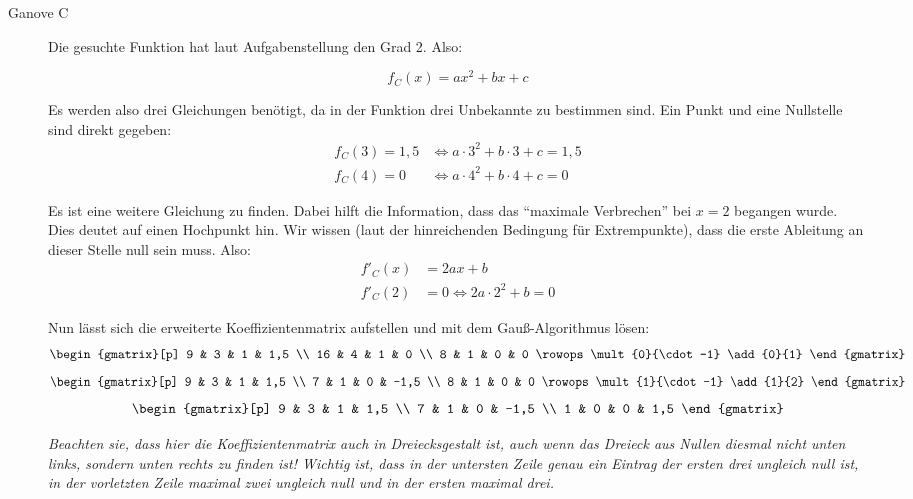 \documentclass[11pt, a4paper,
]{scrartcl}
\begin{document}
\begin{aufgabe}
\begin{loesung}
\begin{description}
				\item[Ganove C]
				Die gesuchte Funktion hat laut Aufgabenstellung den Grad 2. Also:

				\[ f_C(x) = ax^2 + bx + c \]

				Es werden also drei Gleichungen benötigt, da in der Funktion drei Unbekannte zu bestimmen sind. Ein Punkt und eine Nullstelle sind direkt gegeben:
				\begin{align*}
					f_C(3) = 1,5 &\Leftrightarrow a\cdot 3^2 + b\cdot 3 + c = 1,5 \\
					f_C(4) = 0 &\Leftrightarrow a\cdot 4^2 + b\cdot 4 + c = 0
				\end{align*}

				Es ist eine weitere Gleichung zu finden. Dabei hilft die Information, dass das \enquote{maximale Verbrechen} bei $x=2$ begangen wurde. Dies deutet auf einen Hochpunkt hin. Wir wissen (laut der hinreichenden Bedingung für Extrempunkte), dass die erste Ableitung an dieser Stelle null sein muss. Also:
				\begin{align*}
					f'_C(x) &= 2ax + b \\
					f'_C(2) &= 0 \Leftrightarrow 2a\cdot 2^2 + b = 0
				\end{align*}

				Nun lässt sich die erweiterte Koeffizientenmatrix aufstellen und mit dem Gauß-Algorithmus lösen:
				\[ \begin{gmatrix}[p]
				9 & 3 & 1 & 1,5 \\
				16 & 4 & 1 & 0 \\
				8 & 1 & 0 & 0
				\rowops
				\mult{0}{\cdot -1}
				\add{0}{1}
				\end{gmatrix} \]
				\[ \begin{gmatrix}[p]
				9 & 3 & 1 & 1,5 \\
				7 & 1 & 0 & -1,5 \\
				8 & 1 & 0 & 0
				\rowops
				\mult{1}{\cdot -1}
				\add{1}{2}
				\end{gmatrix} \]
				\[ \begin{gmatrix}[p]
				9 & 3 & 1 & 1,5 \\
				7 & 1 & 0 & -1,5 \\
				1 & 0 & 0 & 1,5
				\end{gmatrix} \]

				\textit{Beachten sie, dass hier die Koeffizientenmatrix auch in Dreiecksgestalt ist, auch wenn das Dreieck aus Nullen diesmal nicht unten links, sondern unten rechts zu finden ist!
				Wichtig ist, dass in der untersten Zeile genau ein Eintrag der ersten drei ungleich null ist,
				in der vorletzten Zeile maximal zwei ungleich null und in der ersten maximal drei.}



\end{description}
\end{loesung}
\end{aufgabe}
\end{document}

